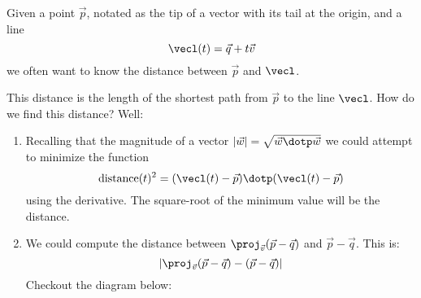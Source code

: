 \documentclass{ximera}
\begin{document}
Given a point $\vec{p}$, notated as the tip of a vector with its tail
at the origin, and a line
\[
\vecl(t) = \vec{q} + t\vec{v}
\]
we often want to know the distance between $\vec{p}$ and $\vecl$.
\begin{image}
\end{image}
This distance is the length of the shortest path from $\vec{p}$ to the
line $\vecl$. How do we find this distance? Well:
\begin{enumerate}
  \item Recalling that the magnitude of a vector $|\vec{w}|
    =\sqrt{\vec{w}\dotp\vec{w}}$ we could attempt to minimize the
    function
    \[
    \mathrm{distance}(t)^2= (\vecl(t)- \vec{p})\dotp (\vecl(t)- \vec{p})
    \]
    using the derivative. The square-root of the minimum value will be
    the distance.
  \item We could compute the distance between
    $\proj_{\vec{v}}(\vec{p}-\vec{q})$ and $\vec{p}-\vec{q}$. This is:
    \[
    |\proj_{\vec{v}}(\vec{p}-\vec{q})- (\vec{p}-\vec{q})|
    \]
    Checkout the diagram below:
\end{enumerate}
\end{document}
